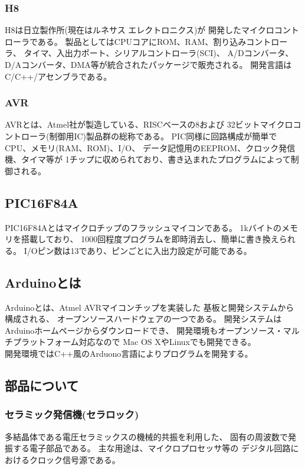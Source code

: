 \documentclass{jsarticle}
\begin{document}
\subsubsection{H8}
H8は日立製作所(現在はルネサス エレクトロニクス)が
開発したマイクロコントローラである。
製品としてはCPUコアにROM、RAM、割り込みコントローラ、
タイマ、入出力ポート、シリアルコントローラ(SCI)、
A/Dコンバータ、D/Aコンバータ、DMA等が統合されたパッケージで販売される。
開発言語はC/C++/アセンブラである。

\subsubsection{AVR}
AVRとは、Atmel社が製造している、RISCベースの8および
32ビットマイクロコントローラ(制御用IC)製品群の総称である。
PIC同様に回路構成が簡単でCPU、メモリ(RAM、ROM)、I/O、
データ記憶用のEEPROM、クロック発信機、タイマ等が
1チップに収められており、書き込まれたプログラムによって制御される。\par

\subsection{PIC16F84A}
PIC16F84Aとはマイクロチップのフラッシュマイコンである。
1kバイトのメモリを搭載しており、
1000回程度プログラムを即時消去し、簡単に書き換えられる。
I/Oピン数は13であり、ピンごとに入出力設定が可能である。

\subsection{Arduinoとは}
Arduinoとは、Atmel AVRマイコンチップを実装した
基板と開発システムから構成される、
オープンソースハードウェアの一つである。
開発システムはArduinoホームページからダウンロードでき、
開発環境もオープンソース・マルチプラットフォーム対応なので
Mac OS XやLinuxでも開発できる。\\
開発環境ではC++風のArduono言語によりプログラムを開発する。

\subsection{部品について}
\subsubsection{セラミック発信機(セラロック)}
多結晶体である電圧セラミックスの機械的共振を利用した、
固有の周波数で発振する電子部品である。
主な用途は、マイクロプロセッサ等の
デジタル回路におけるクロック信号源である。
\end{document}
